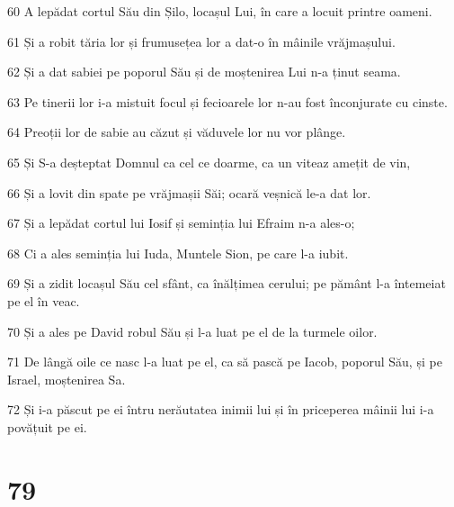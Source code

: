 \par 60 A lepădat cortul Său din Șilo, locașul Lui, în care a locuit printre oameni.
\par 61 Și a robit tăria lor și frumusețea lor a dat-o în mâinile vrăjmașului.
\par 62 Și a dat sabiei pe poporul Său și de moștenirea Lui n-a ținut seama.
\par 63 Pe tinerii lor i-a mistuit focul și fecioarele lor n-au fost înconjurate cu cinste.
\par 64 Preoții lor de sabie au căzut și văduvele lor nu vor plânge.
\par 65 Și S-a deșteptat Domnul ca cel ce doarme, ca un viteaz amețit de vin,
\par 66 Și a lovit din spate pe vrăjmașii Săi; ocară veșnică le-a dat lor.
\par 67 Și a lepădat cortul lui Iosif și seminția lui Efraim n-a ales-o;
\par 68 Ci a ales seminția lui Iuda, Muntele Sion, pe care l-a iubit.
\par 69 Și a zidit locașul Său cel sfânt, ca înălțimea cerului; pe pământ l-a întemeiat pe el în veac.
\par 70 Și a ales pe David robul Său și l-a luat pe el de la turmele oilor.
\par 71 De lângă oile ce nasc l-a luat pe el, ca să pască pe Iacob, poporul Său, și pe Israel, moștenirea Sa.
\par 72 Și i-a păscut pe ei întru nerăutatea inimii lui și în priceperea mâinii lui i-a povățuit pe ei.

\chapter{79}


